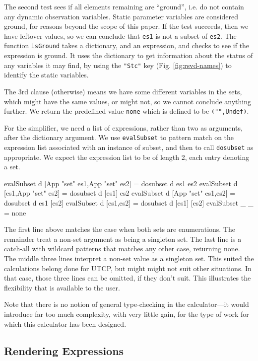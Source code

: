 The second test sees if all elements remaining are ``ground'',
i.e. do not contain any dynamic observation variables.
Static parameter variables are considered ground,
for reasons beyond the scope of this paper.
If the test succeeds,
then we have leftover values, so we can conclude that \texttt{es1} is not a subset of \texttt{es2}.
The function \texttt{isGround} takes a dictionary,
and an expression, and checks to see if the expression is ground.
It uses the dictionary to get information about the status
of any variables it may find, by using the \verb$"Stc"$ key
(Fig. \ref{fig:rsvd-names}) to identify the static variables.

The 3rd clause (otherwise) means we have some different
variables in the sets, which might have the same values,
or might not, so we cannot conclude anything further.
We return the predefined value \texttt{none} which is defined to be
\verb$("",Undef)$.

For the simplifier, we need a list of expressions,
rather than two as arguments, after the dictionary argument.
We use \texttt{evalSubset} to pattern match on the expression list
associated with an instance of subset,
and then to call \texttt{dosubset} as appropriate.
We expect the expression list to be of length 2,
each entry denoting a set.
\begin{code}
evalSubset d [App "set" es1,App "set" es2] = dosubset d es1 es2
evalSubset d [es1,App "set" es2] = dosubset d [es1] es2
evalSubset d [App "set" es1,es2] = dosubset d es1 [es2]
evalSubset d [es1,es2] = dosubset d [es1] [es2]
evalSubset _ _ = none
\end{code}
The first line above matches the case when both sets are enumerations.
The remainder treat a non-set argument as being a singleton set.
The last line is a catch-all with wildcard patterns that matches
any other case, returning none.
The middle three lines interpret a non-set value as a singleton set.
This suited the calculations belong done for UTCP,
but might might not suit other situations.
In that case, those three lines can be omitted, if they don't suit.
This illustrates the flexibility that is available to the user.

Note that there is no notion of general type-checking
in the calculator---it would introduce far too much complexity,
with very little gain, for the type of work for which this calculator has been designed.

\subsection{Rendering Expressions}

